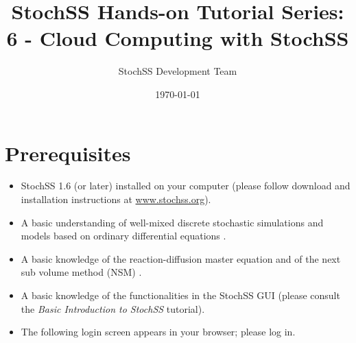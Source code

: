 \documentclass[12pt,notitlepage,nofootinbib]{revtex4}
\begin{document}
\title{StochSS Hands-on Tutorial Series: 6 - Cloud Computing with StochSS}

\author{StochSS Development Team}

\date{\today}

\maketitle

\section{\label{sec:pre}Prerequisites}
\begin{itemize}
\item StochSS 1.6 (or later) installed on your computer (please follow download and installation instructions at \url{www.stochss.org}). 
\item A basic understanding of well-mixed discrete stochastic simulations and models based on ordinary differential equations \cite{dan,sundials}.
\item A basic knowledge of the reaction-diffusion master equation and of the next sub volume method (NSM) \cite{nsm}.
\item  A basic knowledge of the functionalities in the StochSS GUI (please consult the \textit{Basic Introduction to StochSS} tutorial).
\item The following login screen appears in your browser; please log in.
\end{itemize}
\end{document}
